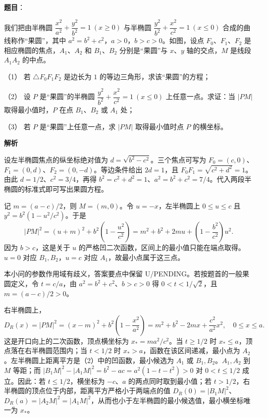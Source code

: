 \begin{answer}

\textbf{题目}：

我们把由半椭圆 $\dfrac{x^2}{a^2}+\dfrac{y^2}{b^2}=1\ (x\geqslant0)$ 与半椭圆 $\dfrac{y^2}{b^2}+\dfrac{x^2}{c^2}=1\ (x\leqslant0)$ 合成的曲线称作“果圆”，其中 $a^2=b^2+c^2$，$a>0$，$b>c>0$。如图，设点 $F_0$、$F_1$、$F_2$ 是相应椭圆的焦点，$A_1$、$A_2$ 和 $B_1$、$B_2$ 分别是“果圆”与 $x$、$y$ 轴的交点，$M$ 是线段 $A_1A_2$ 的中点。

（1） 若 $\triangle F_0F_1F_2$ 是边长为 $1$ 的等边三角形，求该“果圆”的方程；

（2） 设 $P$ 是“果圆”的半椭圆 $\dfrac{y^2}{b^2}+\dfrac{x^2}{c^2}=1\ (x\leqslant0)$ 上任意一点。求证：当 $|PM|$ 取得最小值时，$P$ 在点 $B_1$、$B_2$ 或 $A_1$ 处；

（3） 若 $P$ 是“果圆”上任意一点，求 $|PM|$ 取得最小值时点 $P$ 的横坐标。
\nopagebreak[4]
\begin{center}\end{center}
\nopagebreak[4]
\textbf{解析}


设左半椭圆焦点的纵坐标绝对值为 $d=\sqrt{b^2-c^2}$。三个焦点可写为 $F_0=(c,0)$、$F_1=(0,d)$、$F_2=(0,-d)$。等边条件给出 $2d=1$，且 $F_0F_1=\sqrt{c^2+d^2}=1$。由此 $d=1/2$、$c^2=3/4$，再得 $b^2=c^2+d^2=1$、$a^2=b^2+c^2=7/4$。代入两段半椭圆的标准式即可写出果圆方程。


记 $m=(a-c)/2$，则 $M=(m,0)$。令 $u=-x$，左半椭圆上 $0\le u\le c$ 且 $y^2=b^2(1-u^2/c^2)$。于是
\nopagebreak[4]
\[
|PM|^2=(u+m)^2+b^2\left(1-\frac{u^2}{c^2}\right)
=m^2+b^2+2mu+\left(1-\frac{b^2}{c^2}\right)u^2.
\]
因为 $b>c$，这是关于 $u$ 的严格凹二次函数，区间上的最小值只能在端点取得。$u=0$ 对应 $B_1,B_2$，$u=c$ 对应 $A_1$，故最小点属于这三点。


本小问的参数作用域有歧义，答案要点中保留 U/PENDING。若按题首的一般果圆定义，令 $t=c/a$，由 $a^2=b^2+c^2$、$b>c>0$ 得 $0<t<1/\sqrt2$，且 $m=(a-c)/2>0$。

右半椭圆上，
\nopagebreak[4]
\[
D_R(x)=|PM|^2=(x-m)^2+b^2\left(1-\frac{x^2}{a^2}\right)
=m^2+b^2-2mx+\frac{c^2}{a^2}x^2,\quad 0\le x\le a.
\]
这是开口向上的二次函数，顶点横坐标为 $x_*=ma^2/c^2$。当 $t\ge1/2$ 时 $x_*\le a$，顶点落在右半椭圆范围内；当 $t<1/2$ 时 $x_*>a$，函数在该区间递减，最小点为 $A_2$。左半椭圆上距离平方是（2）中的凹函数，最小候选为 $A_1$ 或 $B_1,B_2$。$A_1,A_2$ 到 $M$ 等距；而 $|B_1M|^2-|A_1M|^2=b^2-ac=a^2(1-t-t^2)>0$ 对 $0<t\le1/2$ 成立。因此：若 $t\le1/2$，横坐标为 $-c$、$a$ 的两点同时取到最小值；若 $t>1/2$，右半椭圆的顶点位于内部，距离平方严格小于两端点的值 $D_R(0)=|B_1M|^2$、$D_R(a)=|A_2M|^2=|A_1M|^2$，从而也小于左半椭圆的最小候选值，最小横坐标唯一为 $x_*$。


\end{answer}
